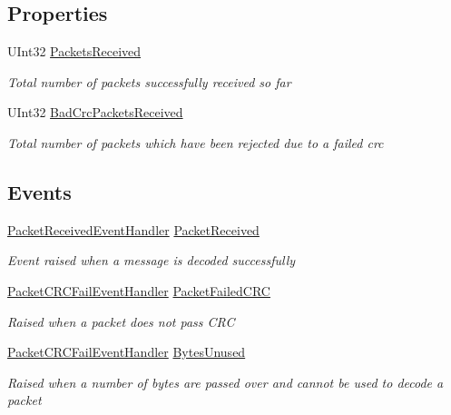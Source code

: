 \subsection*{Properties}
\begin{DoxyCompactItemize}
\item 
U\+Int32 \mbox{\hyperlink{classMavLink_1_1Mavlink_a5fb529a26ee8250d83fac7a1be30a041}{Packets\+Received}}
\begin{DoxyCompactList}\small\item\em Total number of packets successfully received so far \end{DoxyCompactList}\item 
U\+Int32 \mbox{\hyperlink{classMavLink_1_1Mavlink_a85571c31a47c311ac883279e8dcd02c9}{Bad\+Crc\+Packets\+Received}}
\begin{DoxyCompactList}\small\item\em Total number of packets which have been rejected due to a failed crc \end{DoxyCompactList}\end{DoxyCompactItemize}
\subsection*{Events}
\begin{DoxyCompactItemize}
\item 
\mbox{\hyperlink{namespaceMavLink_a78c17c9f049257b0626c8d377735666d}{Packet\+Received\+Event\+Handler}} \mbox{\hyperlink{classMavLink_1_1Mavlink_ae5657dc889b9cbc7ce2c03d1cd5f7e73}{Packet\+Received}}
\begin{DoxyCompactList}\small\item\em Event raised when a message is decoded successfully \end{DoxyCompactList}\item 
\mbox{\hyperlink{namespaceMavLink_a8ed8a6701876b63e5bb9135a9897d679}{Packet\+C\+R\+C\+Fail\+Event\+Handler}} \mbox{\hyperlink{classMavLink_1_1Mavlink_ac73a6b5c5f3ecd09964ec630225fabdd}{Packet\+Failed\+C\+RC}}
\begin{DoxyCompactList}\small\item\em Raised when a packet does not pass C\+RC \end{DoxyCompactList}\item 
\mbox{\hyperlink{namespaceMavLink_a8ed8a6701876b63e5bb9135a9897d679}{Packet\+C\+R\+C\+Fail\+Event\+Handler}} \mbox{\hyperlink{classMavLink_1_1Mavlink_a88f743816b644b0d36b05c188a452fab}{Bytes\+Unused}}
\begin{DoxyCompactList}\small\item\em Raised when a number of bytes are passed over and cannot be used to decode a packet \end{DoxyCompactList}\end{DoxyCompactItemize}


